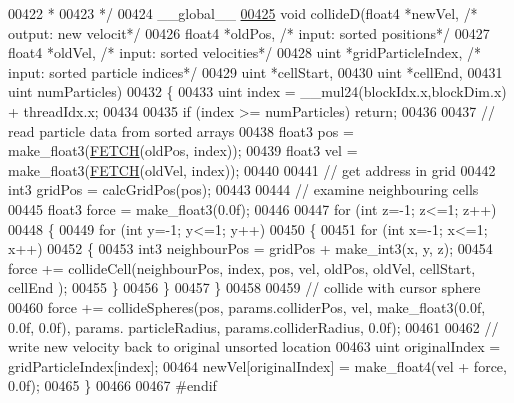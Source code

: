 \begin{DoxyCode}
00422 \textcolor{comment}{ *}
00423 \textcolor{comment}{ */}
00424 \_\_global\_\_
\hypertarget{particles__kernel__impl_8cuh_source_l00425}{}\hyperlink{particles__kernel__impl_8cuh_a9056c5c0f33cbc0acb1c2b12e1a2a530}{00425} \textcolor{keywordtype}{void} collideD(float4 *newVel,               \textcolor{comment}{/* output: new velocit*/}
00426               float4 *oldPos,               \textcolor{comment}{/* input: sorted positions*/}
00427               float4 *oldVel,               \textcolor{comment}{/* input: sorted velocities*/}
00428               uint   *gridParticleIndex,    \textcolor{comment}{/* input: sorted particle indices*/}
00429               uint   *cellStart,
00430               uint   *cellEnd,
00431               uint    numParticles)
00432 \{
00433     uint index = \_\_mul24(blockIdx.x,blockDim.x) + threadIdx.x;
00434 
00435     \textcolor{keywordflow}{if} (index >= numParticles) \textcolor{keywordflow}{return};
00436 
00437     \textcolor{comment}{// read particle data from sorted arrays}
00438     float3 pos = make\_float3(\hyperlink{particles__kernel_8cuh_a12269d678a65f18889c2a7e98c756457}{FETCH}(oldPos, index));
00439     float3 vel = make\_float3(\hyperlink{particles__kernel_8cuh_a12269d678a65f18889c2a7e98c756457}{FETCH}(oldVel, index));
00440 
00441     \textcolor{comment}{// get address in grid}
00442     int3 gridPos = calcGridPos(pos);
00443 
00444     \textcolor{comment}{// examine neighbouring cells}
00445     float3 force = make\_float3(0.0f);
00446 
00447     \textcolor{keywordflow}{for} (\textcolor{keywordtype}{int} z=-1; z<=1; z++)
00448     \{
00449         \textcolor{keywordflow}{for} (\textcolor{keywordtype}{int} y=-1; y<=1; y++)
00450         \{
00451             \textcolor{keywordflow}{for} (\textcolor{keywordtype}{int} x=-1; x<=1; x++)
00452             \{
00453                 int3 neighbourPos = gridPos + make\_int3(x, y, z);
00454                 force += collideCell(neighbourPos, index, pos, vel, oldPos, oldVel, cellStart, cellEnd
      );
00455             \}
00456         \}
00457     \}
00458 
00459     \textcolor{comment}{// collide with cursor sphere}
00460     force += collideSpheres(pos, params.colliderPos, vel, make\_float3(0.0f, 0.0f, 0.0f), params.
      particleRadius, params.colliderRadius, 0.0f);
00461 
00462     \textcolor{comment}{// write new velocity back to original unsorted location}
00463     uint originalIndex = gridParticleIndex[index];
00464     newVel[originalIndex] = make\_float4(vel + force, 0.0f);
00465 \}
00466 
00467 \textcolor{preprocessor}{#}\textcolor{preprocessor}{endif}
\end{DoxyCode}
